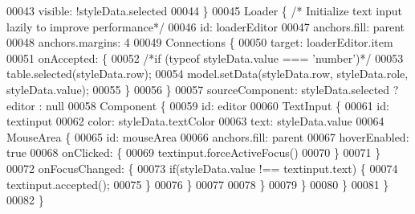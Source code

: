 \begin{DoxyCode}
00043             visible: !styleData.selected
00044         \}
00045         Loader \{ \textcolor{comment}{/* Initialize text input lazily to improve performance*/}
00046             \textcolor{keywordtype}{id}: loaderEditor
00047             anchors.fill: parent
00048             anchors.margins: 4
00049             Connections \{
00050                 target: loaderEditor.item
00051                 onAccepted: \{
00052                     \textcolor{comment}{/*if (typeof styleData.value === 'number')*/}
00053                     table.selected(styleData.row);
00054                     model.setData(styleData.row, styleData.role, styleData.value);
00055                 \}
00056             \}
00057             sourceComponent: styleData.selected ? editor : null
00058             Component \{
00059                 \textcolor{keywordtype}{id}: editor
00060                 TextInput \{
00061                     \textcolor{keywordtype}{id}: textinput
00062                     color: styleData.textColor
00063                     text: styleData.value
00064                     MouseArea \{
00065                         \textcolor{keywordtype}{id}: mouseArea
00066                         anchors.fill: parent
00067                         hoverEnabled: \textcolor{keyword}{true}
00068                         onClicked: \{
00069                             textinput.forceActiveFocus()
00070                         \}
00071                     \}
00072                     onFocusChanged: \{
00073                         \textcolor{keywordflow}{if}(styleData.value !== textinput.text) \{
00074                             textinput.accepted();
00075                         \}
00076                     \}
00077 
00078                 \}
00079             \}
00080         \}
00081     \}
00082 \}
\end{DoxyCode}
